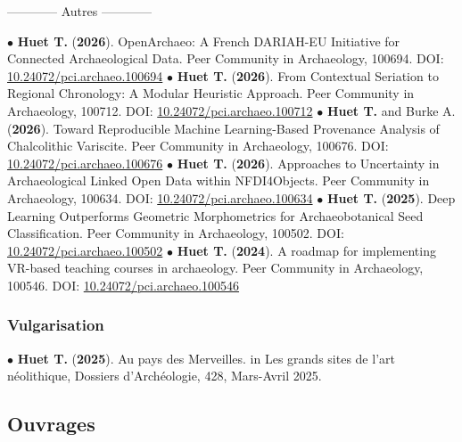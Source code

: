 \documentclass{article}
\newcommand{\fr}[1]{#1}       %
\newcommand{\en}[1]{}     %
\begin{document}
\smallbreak
\fr{\begin{center}------------ Autres ------------\end{center}}\en{{\begin{center}------------ Ohers ------------\end{center}}}
\smallbreak
$\bullet$ \textbf{Huet T.} (\textbf{2026}). OpenArchaeo: A French DARIAH-EU Initiative for Connected Archaeological Data. Peer Community in Archaeology, 100694. DOI: \href{https://doi.org/10.24072/pci.archaeo.100694}{10.24072/pci.archaeo.100694} 
\smallbreak
$\bullet$ \textbf{Huet T.} (\textbf{2026}). From Contextual Seriation to Regional Chronology: A Modular Heuristic Approach. Peer Community in Archaeology, 100712. DOI: \href{https://doi.org/10.24072/pci.archaeo.100712}{10.24072/pci.archaeo.100712} 
\smallbreak
$\bullet$ \textbf{Huet T.} and Burke A. (\textbf{2026}). Toward Reproducible Machine Learning-Based Provenance Analysis of Chalcolithic Variscite. Peer Community in Archaeology, 100676. DOI: \href{https://doi.org/10.24072/pci.archaeo.100676}{10.24072/pci.archaeo.100676} 
\smallbreak
$\bullet$ \textbf{Huet T.} (\textbf{2026}). Approaches to Uncertainty in Archaeological Linked Open Data within NFDI4Objects. Peer Community in Archaeology, 100634. DOI: \href{https://doi.org/10.24072/pci.archaeo.100634}{10.24072/pci.archaeo.100634} 
\smallbreak
$\bullet$ \textbf{Huet T.} (\textbf{2025}). Deep Learning Outperforms Geometric Morphometrics for Archaeobotanical Seed Classification. Peer Community in Archaeology, 100502. DOI: \href{https://doi.org/10.24072/pci.archaeo.100502}{10.24072/pci.archaeo.100502} 
\smallbreak
$\bullet$ \textbf{Huet T.} (\textbf{2024}). A roadmap for implementing VR-based teaching courses in archaeology. Peer Community in Archaeology, 100546. DOI: \href{https://archaeo.peercommunityin.org/articles/rec?id=546}{10.24072/pci.archaeo.100546} 

\subsubsection*{\fr{Vulgarisation}\en{Popularization}}

$\bullet$ \textbf{Huet T.} (\textbf{2025}). Au pays des Merveilles. in Les grands sites de l'art néolithique, Dossiers d'Archéologie, 428, Mars-Avril 2025. 
 

\subsection*{\fr{Ouvrages}\en{Books}}
\end{document}
